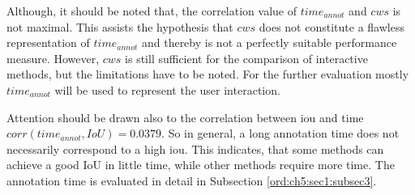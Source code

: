 Although, it should be noted that, the correlation value of $ time_{annot} $ and $ cws $ is not maximal.
This assists the hypothesis that $ cws $ does not constitute a flawless representation of $ time_{annot} $ and thereby is not a perfectly suitable performance measure.
However, $ cws $ is still sufficient for the comparison of interactive methods, but the limitations have to be noted.
For the further evaluation mostly $ time_{annot} $ will be used to represent the user interaction.

Attention should be drawn also to the correlation between \gls{iou} and time \linebreak $ corr \left(time_{annot}, IoU \right) = 0.0379 $.
So in general, a long annotation time does not necessarily correspond to a high \gls{iou}.
This indicates, that some methods can achieve a good IoU in little time, while other methods require more time.
The annotation time is evaluated in detail in Subsection \ref{ord:ch5:sec1:subsec3}. 

\begin{table}[h!]
	\centering
	\caption[Correlation table]{
		Correlation table based on the \textit{Pearson} standard correlation coefficient \cite{Kirch08-CorrPearson}.
		The redundant part of the table is left empty. 
		The variables $ n_{clicks} $, $ n_{strokes} $, $ time_{strokes} $, and $ ws $ all show a intermediate correlation with $ time_{annot} $, while their combination $ cws $ shows a strong correlation of $ 0.8610 $. 
		The correlation between $ IoU $ and $ time_{annot} $ indicates almost no relationship.
	}\label{tab:ch5:correlation-matrix}
\end{table}



